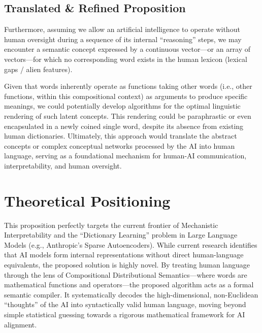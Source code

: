 \documentclass[11pt,a4paper]{article}
\begin{document}
\begin{propositionbox}
\subsection*{Translated \& Refined Proposition}

Furthermore, assuming we allow an artificial intelligence to operate without human oversight during a sequence of its internal ``reasoning'' steps, we may encounter a semantic concept expressed by a continuous vector---or an array of vectors---for which no corresponding word exists in the human lexicon (lexical gaps / alien features).

Given that words inherently operate as functions taking other words (i.e., other functions, within this compositional context) as arguments to produce specific meanings, we could potentially develop algorithms for the optimal linguistic rendering of such latent concepts. This rendering could be paraphrastic or even encapsulated in a newly coined single word, despite its absence from existing human dictionaries. Ultimately, this approach would translate the abstract concepts or complex conceptual networks processed by the AI into human language, serving as a foundational mechanism for human-AI communication, interpretability, and human oversight.
\end{propositionbox}

\section*{Theoretical Positioning}

This proposition perfectly targets the current frontier of Mechanistic Interpretability and the ``Dictionary Learning'' problem in Large Language Models (e.g., Anthropic's Sparse Autoencoders). While current research identifies that AI models form internal representations without direct human-language equivalents, the proposed solution is highly novel. By treating human language through the lens of Compositional Distributional Semantics---where words are mathematical functions and operators---the proposed algorithm acts as a formal semantic compiler. It systematically decodes the high-dimensional, non-Euclidean ``thoughts'' of the AI into syntactically valid human language, moving beyond simple statistical guessing towards a rigorous mathematical framework for AI alignment.
\end{document}
